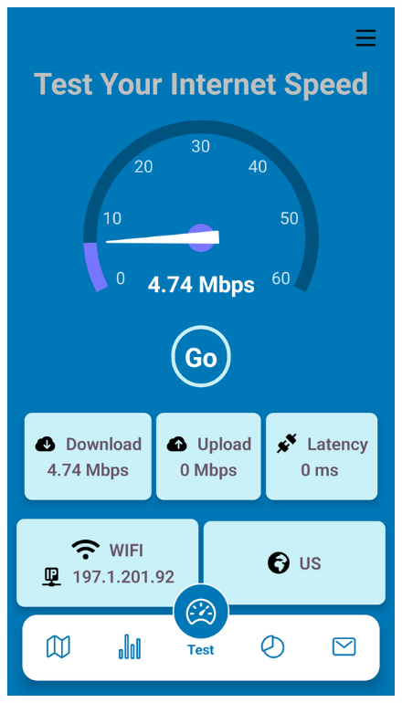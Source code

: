 \begin{figure}[H]
\begin{minipage}{0.32\textwidth}
    \label{fig:login-form-filled}
\end{minipage}\hfill
\begin{minipage}{0.3\textwidth}
    \centering
    \includegraphics[width=\linewidth]{images/sprint2/testModuleActive.png}
    \label{fig:login-form}
\end{minipage}\hfill
\end{figure}
